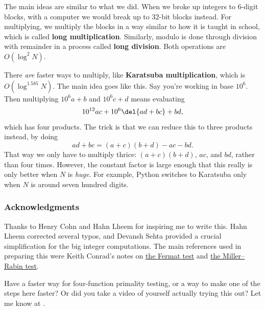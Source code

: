 \documentclass[11pt,paper=letter]{scrartcl}
\begin{document}
The main ideas are similar to what we did. When we broke up integers to 6-digit blocks, with a computer we would break up to 32-bit blocks instead. For multiplying, we multiply the blocks in a way similar to how it is taught in school, which is called \textbf{long multiplication}. Similarly, modulo is done through division with remainder in a process called \textbf{long division}. Both operations are $O(\log^2 N)$.

There \emph{are} faster ways to multiply, like \textbf{Karatsuba multiplication}, which is $O(\log^{1.585} N)$. The main idea goes like this. Say you're working in base $10^6$. Then multiplying $10^6 a + b$ and $10^6 c + d$ means evaluating
$$10^{12} ac + 10^6 \del{ad + bc} + bd,$$
which has four products. The trick is that we can reduce this to three products instead, by doing
$$ad + bc = (a + c)(b + d) - ac - bd.$$
That way we only have to multiply thrice: $(a + c)(b + d)$, $ac$, and $bd$, rather than four times. However, the constant factor is large enough that this really is only better when $N$ is \emph{huge}. For example, Python switches to Karatsuba only when $N$ is around seven hundred digits.

\subsubsection*{Acknowledgments}

Thanks to Henry Cohn and Hahn Lheem for inspiring me to write this. Hahn Lheem corrected several typos, and Devansh Sehta provided a crucial simplification for the big integer computations. The main references used in preparing this were Keith Conrad's notes on \href{https://kconrad.math.uconn.edu/blurbs/ugradnumthy/fermattest.pdf}{the Fermat test} and \href{https://kconrad.math.uconn.edu/blurbs/ugradnumthy/millerrabin.pdf}{the Miller--Rabin test}. 

Have a faster way for four-function primality testing, or a way to make one of the steps here faster? Or did you take a video of yourself actually trying this out? Let me know at .
\end{document}
